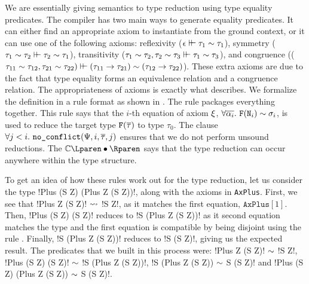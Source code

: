 \documentclass[format=acmsmall,manuscript,screen,nonacm,margin=1in,11pt]{acmart}
\begin{document}
We are essentially giving semantics to type reduction using type equality predicates.
The compiler has two main ways to generate equality predicates.
It can either find an appropriate axiom to instantiate from the ground context,
or it can use one of the following axioms: reflexivity ($\epsilon\vdash\hspace{-0.7ex}\vdash\tau_1\mathrel{\sim}\tau_1$),
symmetry ($\tau_1\mathrel{\sim}\tau_2 \vdash\hspace{-0.7ex}\vdash \tau_2\mathrel{\sim}\tau_1$),
transitivity ($\tau_1\mathrel{\sim}\tau_2, \tau_2\mathrel{\sim}\tau_3\vdash\hspace{-0.7ex}\vdash\tau_1\mathrel{\sim}\tau_3$),
and congruence (($\tau_{11}\mathrel{\sim}\tau_{12},\tau_{21}\mathrel{\sim}\tau_{22})\vdash\hspace{-0.7ex}\vdash(\tau_{11}\to\tau_{21})\mathrel{\sim}(\tau_{12}\to\tau_{22})$).
These extra axioms are due to the fact that type equality forms an equivalence relation and a congruence relation.
The appropriateness of axioms is exactly what  describes. We formalize the definition
in a rule format as shown in . The rule 
packages everything together. This rule says that the $i$-th equation of axiom $\xi$,
$\forall\overline{\alpha_i}.~\texttt{F}(\texttt{N}_i) \mathrel{\sim} \sigma_i$, is used to reduce
the target type $\texttt{F}(\overline{\tau})$ to type $\tau_0$.
The clause $\forall j < i. ~\texttt{no\_conflict}(\Psi, i, \overline{\tau}, j)$ ensures that we do not
perform unsound reductions. The $\TEvalCtxt\bullet$ says that the type reduction
can occur anywhere within the type structure. 

To get an idea of how these rules work out for the type reduction, let us consider the type !Plus (S Z) (Plus Z (S Z))!,
along with the axioms in \texttt{AxPlus}. First, we see that !Plus Z (S Z)! $\mathrel{\rightsquigarrow}$ !S Z!,
as it matches the first equation, $\texttt{AxPlus}[1]$. Then, !Plus (S Z) (S Z)! reduces to !S (Plus Z (S Z))!
as it second equation matches the type and the first equation is compatible by being disjoint using
the rule . Finally, !S (Plus Z (S Z))! reduces to !S (S Z)!, giving us the expected result.
The predicates that we built in this process were: !Plus Z (S Z)! $\mathrel{\sim}$ !S Z!,
!Plus (S Z) (S Z)! $\mathrel{\sim}$ !S (Plus Z (S Z))!, !S (Plus Z (S Z)) $\mathrel{\sim}$ S (S Z)!
and !Plus (S Z) (Plus Z (S Z)) $\mathrel{\sim}$ S (S Z)!.

\newcommand\TCast{
  \ib{\irule[\trule{t-cast}]
    {\CoTyping \TEnv \Co {\tau_1\teq\tau_2}}
    {\Typing \TEnv \Tm \tau_1};
    {\Typing \TEnv \Tm \tau_2}}}

\newcommand\TTyAbs{
  \ib{\irule[\trule{t-tyabs}]
    {\ValidType \TEnv \alpha}
    {\Typing {\TEnv,\alpha} \Tm \tau};
    {\Typing \TEnv {\TLam\alpha\Tm} {\Forall\alpha\tau}}}}

\newcommand\TTyApp{
  \ib{\irule[\trule{t-tyapp}]
    {\ValidType \TEnv {\tau_1}}
    {\Typing \TEnv \Tm {\Forall\alpha\tau}};
    {\Typing \TEnv {\Tm\App\tau_1} \tau[\tau_1/\alpha]}}}
\end{document}
